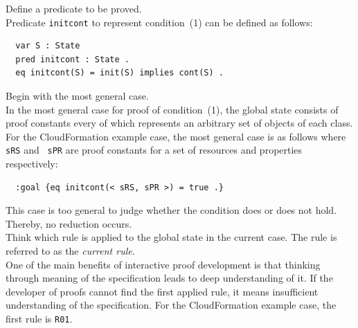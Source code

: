 \documentclass[12pt]{report}
\begin{document}
 Define a predicate to be proved. \\
Predicate {\tt initcont} to represent condition~(1) can be defined as follows:
\small
\begin{verbatim}
  var S : State
  pred initcont : State .
  eq initcont(S) = init(S) implies cont(S) .
\end{verbatim}
\normalsize

 Begin with the most general case. \\ In the
most general case for proof of condition~(1), the global
state consists of proof constants every of which represents an
arbitrary set of objects of each class. For the CloudFormation example
case, the most general case is as follows where {\tt sRS} and {\tt
  sPR} are proof constants for a set of resources and properties
respectively:
\small
\begin{verbatim}
  :goal {eq initcont(< sRS, sPR >) = true .}
\end{verbatim}
\normalsize
This case is too general to judge whether the condition does or does
not hold. Thereby, no reduction occurs.\\

 Think which rule is applied to the global
state in the current case. The rule is referred to as the {\it current
rule}.\\
One of the main benefits of interactive proof development is that
thinking through meaning of the specification leads to deep
understanding of it. If the developer of proofs cannot find the first
applied rule, it means insufficient understanding of the
specification. For the CloudFormation example case, the first rule is
{\tt R01}. \\
\end{document}
